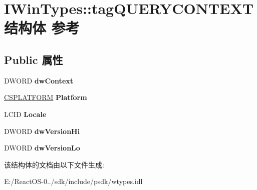 \hypertarget{struct_i_win_types_1_1tag_q_u_e_r_y_c_o_n_t_e_x_t}{}\section{I\+Win\+Types\+:\+:tag\+Q\+U\+E\+R\+Y\+C\+O\+N\+T\+E\+X\+T结构体 参考}
\label{struct_i_win_types_1_1tag_q_u_e_r_y_c_o_n_t_e_x_t}
\subsection*{Public 属性}
\begin{DoxyCompactItemize}
\item 
\mbox{\label{struct_i_win_types_1_1tag_q_u_e_r_y_c_o_n_t_e_x_t_a1052e2ab7bb6c5b837c39684d74ff372}} 
D\+W\+O\+RD {\bfseries dw\+Context}
\item 
\mbox{\label{struct_i_win_types_1_1tag_q_u_e_r_y_c_o_n_t_e_x_t_a1d02b488b3741bdb5a3860eb2021cbb5}} 
\hyperlink{struct_i_win_types_1_1tag_c_s_p_l_a_t_f_o_r_m}{C\+S\+P\+L\+A\+T\+F\+O\+RM} {\bfseries Platform}
\item 
\mbox{\label{struct_i_win_types_1_1tag_q_u_e_r_y_c_o_n_t_e_x_t_a4d8b50bd152197424a48a872a4e40063}} 
L\+C\+ID {\bfseries Locale}
\item 
\mbox{\label{struct_i_win_types_1_1tag_q_u_e_r_y_c_o_n_t_e_x_t_a8415e72b75acca161837415889483456}} 
D\+W\+O\+RD {\bfseries dw\+Version\+Hi}
\item 
\mbox{\label{struct_i_win_types_1_1tag_q_u_e_r_y_c_o_n_t_e_x_t_a17d88cbc8843fdf25e5bf8882ab69aa3}} 
D\+W\+O\+RD {\bfseries dw\+Version\+Lo}
\end{DoxyCompactItemize}


该结构体的文档由以下文件生成\+:\begin{DoxyCompactItemize}
\item 
E\+:/\+React\+O\+S-\/0../sdk/include/psdk/wtypes.\+idl\end{DoxyCompactItemize}
